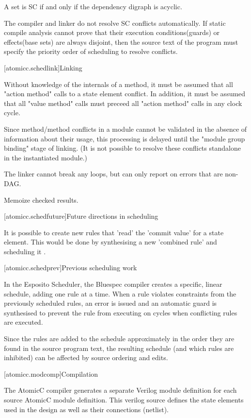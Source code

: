 A set is SC if and only if the dependency digraph is acyclic.

The compiler and linker do not resolve SC conflicts automatically.
If static compile analysis cannot prove that their execution conditions(guards) or
effects(base sets) are always disjoint,
then the source text of the program must specify the priority order of scheduling
to resolve conflicts.

[atomicc.schedlink]{Linking}

Without knowledge of the internals of a method, it must be assumed that all "action method"
calls to a state element conflict.  In addition, it must be assumed that all "value method" calls
must preceed all "action method" calls in any clock cycle.

Since method/method conflicts in a module cannot be validated in the absence of
information about their usage, this processing is delayed until the "module group binding"
stage of linking.
(It is not possible to resolve these conflicts standalone in the instantiated module.)

The linker cannot break any loops, but can only report on errors that are non-DAG.

Memoize checked results.

[atomicc.schedfuture]{Future directions in scheduling}

It is possible to create new rules that 'read' the 'commit value' for a state element.
This would be done by synthesising a new 'combined rule' and scheduling it \cite{Rosenband:Thesis}.

[atomicc.schedprev]{Previous scheduling work}

In the Esposito Scheduler\cite{Esposito:Patent},
the Bluespec compiler creates a specific, linear schedule, adding
one rule at a time.  When a rule violates constraints from the previously scheduled
rules, an error is issued and an automatic guard is synthesised to prevent the
rule from executing on cycles when conflicting rules are executed.

Since the rules are added to the schedule approximately in the order they are
found in the source program text, the resulting schedule (and which rules are
inhibited) can be affected by source ordering and edits.

[atomicc.modcomp]{Compilation}

The AtomicC compiler generates a separate Verilog module definition
for each source AtomicC module definition.
This verilog source defines the state elements
used in the design as well as their connections (netlist).

